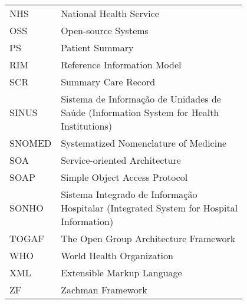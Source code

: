 \begin{flushleft}
\begin{tabular}{l p{0.8\linewidth}}
NHS		& National Health Service \\
OSS		& Open-source Systems \\
PS		& Patient Summary \\
RIM		& Reference Information Model \\
SCR		& Summary Care Record \\
SINUS	& Sistema de Informação de Unidades de Saúde (Information System for Health Institutions)\\
SNOMED	& Systematized Nomenclature of Medicine \\
SOA		& Service-oriented Architecture \\
SOAP	& Simple Object Access Protocol \\
SONHO	& Sistema Integrado de Informação Hospitalar (Integrated System for Hospital Information) \\
TOGAF   & The Open Group Architecture Framework \\
WHO		& World Health Organization \\
XML	    & Extensible Markup Language \\
ZF		& Zachman Framework 
\end{tabular}
\end{flushleft}

